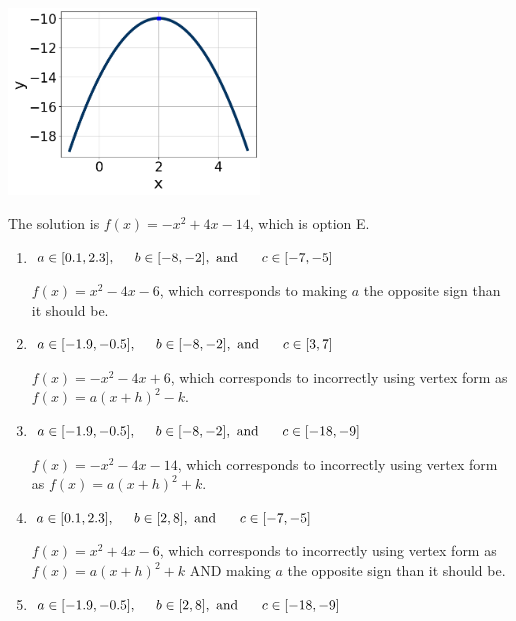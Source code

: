 \documentclass{extbook}[14pt]
\begin{document}
\begin{enumerate}
{\begin{center}
    \includegraphics[width=0.5\textwidth]{../Figures/quadraticGraphToEquationC.png}
\end{center}



The solution is \( f(x) = -x^{2} +4 x -14 \), which is option E.\begin{enumerate}[label=\Alph*.]
\item \( a \in [0.1, 2.3], \hspace*{5mm} b \in [-8, -2], \text{ and } \hspace*{5mm} c \in [-7, -5] \)

$f(x)=x^{2} -4 x -6$, which corresponds to making $a$ the opposite sign than it should be.
\item \( a \in [-1.9, -0.5], \hspace*{5mm} b \in [-8, -2], \text{ and } \hspace*{5mm} c \in [3, 7] \)

$f(x)=-x^{2} -4 x + 6$, which corresponds to incorrectly using vertex form as $f(x) = a(x+h)^2 - k$.
\item \( a \in [-1.9, -0.5], \hspace*{5mm} b \in [-8, -2], \text{ and } \hspace*{5mm} c \in [-18, -9] \)

$f(x)=-x^{2} -4 x -14$, which corresponds to incorrectly using vertex form as $f(x) = a(x+h)^2+k$.
\item \( a \in [0.1, 2.3], \hspace*{5mm} b \in [2, 8], \text{ and } \hspace*{5mm} c \in [-7, -5] \)

$f(x)=x^{2} +4 x -6$, which corresponds to incorrectly using vertex form as $f(x) = a(x+h)^2+k$ AND making $a$ the opposite sign than it should be.
\item \( a \in [-1.9, -0.5], \hspace*{5mm} b \in [2, 8], \text{ and } \hspace*{5mm} c \in [-18, -9] \)


\end{enumerate}}
\end{enumerate}
\end{document}
